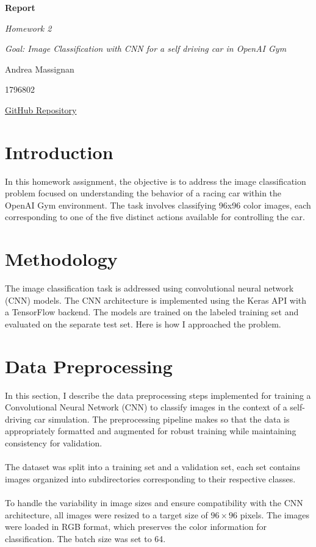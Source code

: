 \documentclass{article}
\begin{document}
\begin{titlepage}
    \centering
    \vspace*{2cm}
    {\Huge\bfseries Report\par}
    \vspace{2cm}
    {\Large\itshape Homework 2\par}
    \vspace{0.5cm}
    {\large\itshape Goal: Image Classification with CNN for a self driving car in OpenAI Gym\par}
    \vfill
    {\Large Andrea Massignan\par}
    {\Large 1796802\par}
    \vfill
    \href{https://github.com/duchannes19/Homework-2}{GitHub Repository}
\end{titlepage}

\section{Introduction}

In this homework assignment, the objective is to address the image classification problem focused on understanding the behavior of a racing car within the OpenAI Gym environment. The task involves classifying 96x96 color images, each corresponding to one of the five distinct actions available for controlling the car.

\section{Methodology}

The image classification task is addressed using convolutional neural network (CNN) models. The CNN architecture is implemented using the Keras API with a TensorFlow backend. The models are trained on the labeled training set and evaluated on the separate test set.
\newline
\newline
Here is how I approached the problem.

\section{Data Preprocessing}

In this section, I describe the data preprocessing steps implemented for training a Convolutional Neural Network (CNN) to classify images in the context of a self-driving car simulation. The preprocessing pipeline makes so that the data is appropriately formatted and augmented for robust training while maintaining consistency for validation.
\\\\
The dataset was split into a training set and a validation set, each set contains images organized into subdirectories corresponding to their respective classes.
\\\\
To handle the variability in image sizes and ensure compatibility with the CNN architecture, all images were resized to a target size of \(96 \times 96\) pixels. The images were loaded in RGB format, which preserves the color information for classification. The batch size was set to 64.
\end{document}
